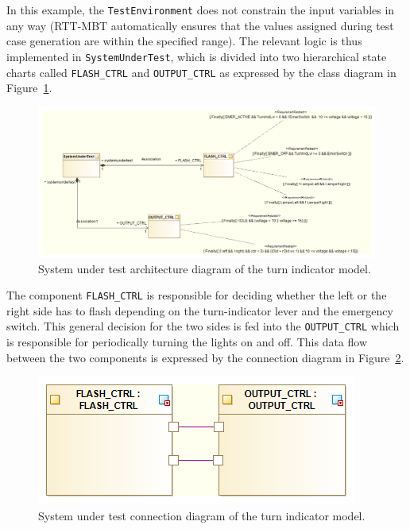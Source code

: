 In this example, the {\tt TestEnvironment} does not constrain the input
variables in any way (RTT-MBT automatically ensures that the values assigned
during test case generation are within the specified range). The relevant
logic is thus implemented in {\tt SystemUnderTest}, which is divided into two
hierarchical state charts called {\tt FLASH\_CTRL} and {\tt OUTPUT\_CTRL}
as expressed by the class diagram in Figure~\ref{figure:turnindicator:sut-architecture}.
\begin{figure}[hpt!]
    \centerline{\includegraphics[scale=0.4]{turnindicator/VSI-modelio_turn_indication_small_sut_architecture_diagram}}
    \caption{System under test architecture diagram of the turn indicator model.}
    \label{figure:turnindicator:sut-architecture}
\end{figure}
The component {\tt FLASH\_CTRL} is responsible for deciding whether the left or the
right side has to flash depending on the turn-indicator lever and the emergency switch.
This general decision for the two sides is fed into the {\tt OUTPUT\_CTRL}
which is responsible for periodically turning the lights on and off.
This data flow between the two components is expressed by the connection diagram in
Figure~\ref{figure:turnindicator:sut-connections}.
\begin{figure}[hpt!]
    \centerline{\includegraphics[scale=0.5]{turnindicator/VSI-modelio_turn_indication_small_sut_connection_diagram}}
    \caption{System under test connection diagram of the turn indicator model.}
    \label{figure:turnindicator:sut-connections}
\end{figure}

